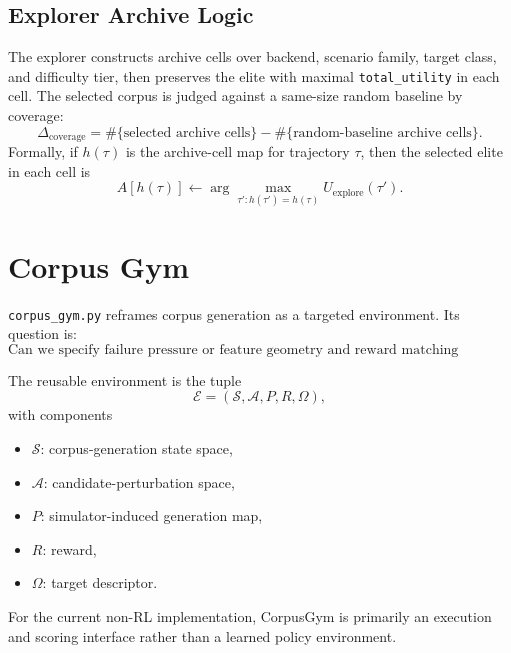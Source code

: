 \documentclass[11pt]{article}
\begin{document}
\subsection*{Explorer Archive Logic}

The explorer constructs archive cells over backend, scenario family,
target class, and difficulty tier, then preserves the elite with maximal
\texttt{total\_utility} in each cell. The selected corpus is judged against a
same-size random baseline by coverage:
\begin{equation}
    \Delta_{\text{coverage}}
    =
    \#\{\text{selected archive cells}\}
    -
    \#\{\text{random-baseline archive cells}\}.
\end{equation}
Formally, if \(h(\tau)\) is the archive-cell map for trajectory \(\tau\), then
the selected elite in each cell is
\begin{equation}
    A[h(\tau)]
    \leftarrow
    \arg\max_{\tau' : h(\tau') = h(\tau)} U_{\text{explore}}(\tau').
\end{equation}

\section{Corpus Gym}

\texttt{corpus\_gym.py} reframes corpus generation as a targeted environment.
Its question is:
\begin{equation}
    \text{Can we specify failure pressure or feature geometry and reward matching trajectories?}
\end{equation}

The reusable environment is the tuple
\begin{equation}
    \mathcal{E} = (\mathcal{S}, \mathcal{A}, P, R, \Omega),
\end{equation}
with components
\begin{itemize}[leftmargin=1.5em]
    \item \(\mathcal{S}\): corpus-generation state space,
    \item \(\mathcal{A}\): candidate-perturbation space,
    \item \(P\): simulator-induced generation map,
    \item \(R\): reward,
    \item \(\Omega\): target descriptor.
\end{itemize}
For the current non-RL implementation, CorpusGym is primarily an execution and
scoring interface rather than a learned policy environment.
\end{document}
